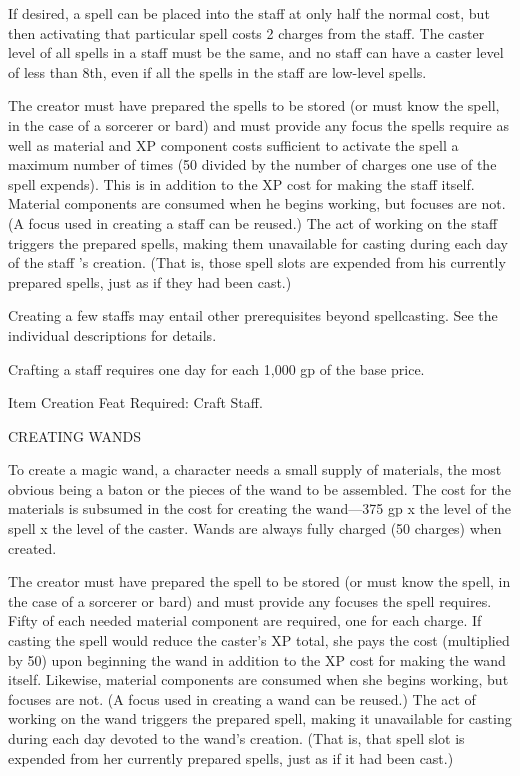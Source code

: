 If desired, a spell can be placed into the staff at only half the normal cost, 
but then activating that particular spell costs 2 charges from the staff. The caster 
level of all spells in a staff must be the same, and no staff can have a caster 
level of less than 8th, even if all the spells in the staff are low-level spells.

The creator must have prepared the spells to be stored (or must know the spell, 
in the case of a sorcerer or bard) and must provide any focus the spells require 
as well as material and XP component costs sufficient to activate the spell a maximum 
number of times (50 divided by the number of charges one use of the spell expends). 
This is in addition to the XP cost for making the staff itself. Material components 
are consumed when he begins working, but focuses are not. (A focus used in creating 
a staff can be reused.) The act of working on the staff triggers the prepared spells, 
making them unavailable for casting during each day of the staff 's creation. (That 
is, those spell slots are expended from his currently prepared spells, just as 
if they had been cast.)

Creating a few staffs may entail other prerequisites beyond spellcasting. See the 
individual descriptions for details.

Crafting a staff requires one day for each 1,000 gp of the base price.

Item Creation Feat Required: Craft Staff.

\vspace{12pt}
{\large CREATING WANDS}

To create a magic wand, a character needs a small supply of materials, the most 
obvious being a baton or the pieces of the wand to be assembled. The cost for the 
materials is subsumed in the cost for creating the wand---375 gp x the level of 
the spell x the level of the caster. Wands are always fully charged (50 charges) 
when created.

The creator must have prepared the spell to be stored (or must know the spell, 
in the case of a sorcerer or bard) and must provide any focuses the spell requires. 
Fifty of each needed material component are required, one for each charge. If casting 
the spell would reduce the caster's XP total, she pays the cost (multiplied by 
50) upon beginning the wand in addition to the XP cost for making the wand itself. 
Likewise, material components are consumed when she begins working, but focuses 
are not. (A focus used in creating a wand can be reused.) The act of working on 
the wand triggers the prepared spell, making it unavailable for casting during 
each day devoted to the wand's creation. (That is, that spell slot is expended 
from her currently prepared spells, just as if it had been cast.)

